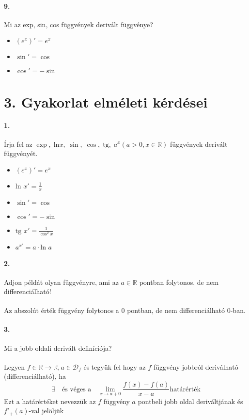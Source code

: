 \documentclass[10pt,a4paper]{article}
\renewcommand{\>}{\rightarrow}
\begin{document}
\paragraph{9.}
Mi az exp, sin, cos függvények derivált függvénye? \\

\begin{itemize}
\item $(e^x)' = e^x$
\item $\sin ' = \cos$
\item $\cos ' = -\sin$ 
\end{itemize}
\newpage

\section{3. Gyakorlat elméleti kérdései}
\paragraph{1.}
Írja fel az $\exp, \; \text{ln}x,\; \sin,\; \cos,\; \text{tg},\; a^x (a>0, x\in\mathbb{R})$ függvények derivált függvényét.  \\
\begin{itemize}
\item $(e^x)' = e^x$
\item $\text{ln }x'=\frac{1}{x}$
\item $\sin ' = \cos$
\item $\cos ' = -\sin$ 
\item $\text{tg }x' = \frac{1}{\cos^2 x }$
\item $ a^{x'} = a \cdot \text{ln }a $
\end{itemize}
\paragraph{2.}
Adjon példát olyan függvényre, ami az $a \in \mathbb{R}$ pontban folytonos, de nem differenciálható! \\
\\
Az abszolút érték függvény folytonos a 0 pontban, de
nem differenciálható 0-ban.
\paragraph{3.}
Mi a jobb oldali derivált definíciója?
\\ \\
Legyen $f\in\mathbb{R}\rightarrow\mathbb{R}, a \in \mathcal{D}_f$ és tegyük fel hogy az $f$ függvény jobbról deriválható (differenciálható), ha 
\[
\exists \quad \text{és véges a} \quad \lim\limits_{x\rightarrow a+0} \frac{f(x)-f(a)}{x-a} \text{határérték}
\] 
Ezt a határértéket nevezzük az $f$ függvény $a$ pontbeli jobb oldal deriváltjának és $f'_+(a)$-val jelöljük 
\end{document}
